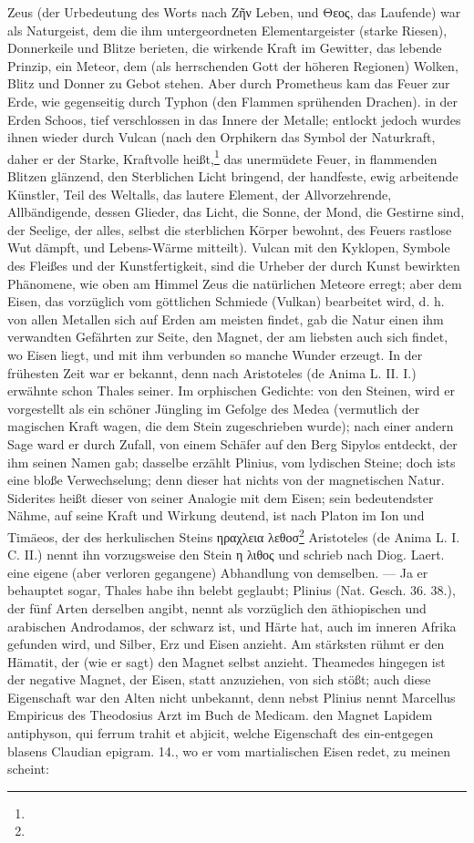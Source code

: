 \documentclass[a4paper, 11pt, oneside, polutonikogreek, german]{article}
\begin{document}
Zeus (der Urbedeutung des Worts nach Ζῆν Leben, und Θεος, das Laufende) war als Naturgeist, dem die ihm untergeordneten Elementargeister (starke Riesen), Donnerkeile und Blitze berieten, die wirkende Kraft im Gewitter, das lebende Prinzip, ein Meteor, dem (als herrschenden Gott der höheren Regionen) Wolken, Blitz und Donner zu Gebot stehen. Aber durch Prometheus kam das Feuer zur Erde, wie gegenseitig durch Typhon (den Flammen sprühenden Drachen). in der Erden Schoos, tief verschlossen in das Innere der Metalle; entlockt jedoch wurdes ihnen wieder durch Vulcan (nach den Orphikern das Symbol der Naturkraft, daher er der Starke, Kraftvolle heißt,\footnote{} das unermüdete Feuer, in flammenden Blitzen glänzend, den Sterblichen Licht bringend, der handfeste, ewig arbeitende Künstler, Teil des Weltalls, das lautere Element, der Allvorzehrende, Allbändigende, dessen Glieder, das Licht, die Sonne, der Mond, die Gestirne sind, der Seelige, der alles, selbst die sterblichen Körper bewohnt, des Feuers rastlose Wut dämpft, und Lebens-Wärme mitteilt). Vulcan mit den Kyklopen, Symbole des Fleißes und der Kunstfertigkeit, sind die Urheber der durch Kunst bewirkten Phänomene, wie oben am Himmel Zeus die natürlichen Meteore erregt; aber dem Eisen, das vorzüglich vom göttlichen Schmiede (Vulkan) bearbeitet wird, d. h. von allen Metallen sich auf Erden am meisten findet, gab die Natur einen ihm verwandten Gefährten zur Seite, den Magnet, der am liebsten auch sich findet, wo Eisen liegt, und mit ihm verbunden so manche Wunder erzeugt. In der frühesten Zeit war er bekannt, denn nach Aristoteles (de Anima L. II. I.) erwähnte schon Thales seiner. Im orphischen Gedichte: von den Steinen, wird er vorgestellt als ein schöner Jüngling im Gefolge des Medea (vermutlich der magischen Kraft wagen, die dem Stein zugeschrieben wurde); nach einer andern Sage ward er durch Zufall, von einem Schäfer auf den Berg Sipylos entdeckt, der ihm seinen Namen gab; dasselbe erzählt Plinius, vom lydischen Steine; doch ists eine bloße Verwechselung; denn dieser hat nichts von der magnetischen Natur. Siderites heißt dieser von seiner Analogie mit dem Eisen; sein bedeutendster Nähme, auf seine Kraft und Wirkung deutend, ist nach Platon im Ion und Timäeos, der des herkulischen Steins ηραχλεια λεθοσ\footnote{} Aristoteles (de Anima L. I. C. II.) nennt ihn vorzugsweise den Stein η λιθος und schrieb nach Diog. Laert. eine eigene (aber verloren gegangene) Abhandlung von demselben. --- Ja er behauptet sogar, Thales habe ihn belebt geglaubt; Plinius (Nat. Gesch. 36. 38.), der fünf Arten derselben angibt, nennt als vorzüglich den äthiopischen und arabischen Androdamos, der schwarz ist, und Härte hat, auch im inneren Afrika gefunden wird, und Silber, Erz und Eisen anzieht. Am stärksten rühmt er den Hämatit, der (wie er sagt) den Magnet selbst anzieht. Theamedes hingegen ist der negative Magnet, der Eisen, statt anzuziehen, von sich stößt; auch diese Eigenschaft war den Alten nicht unbekannt, denn nebst Plinius nennt Marcellus Empiricus des Theodosius Arzt im Buch de Medicam. den Magnet Lapidem antiphyson, qui ferrum trahit et abjicit, welche Eigenschaft des ein-entgegen blasens Claudian epigram. 14., wo er vom martialischen Eisen redet, zu meinen scheint:
\end{document}

